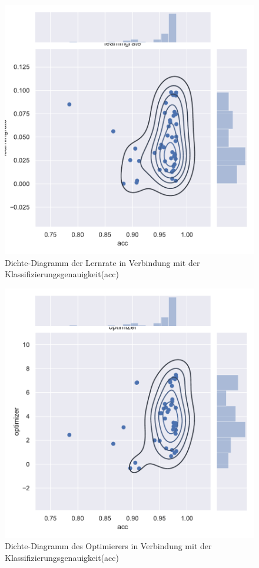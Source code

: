 \begin{figure}[H]
  \centering  
  \includegraphics[scale=0.5]{anhang/GA_250_mnist_digits_False_small_jointplot_learningrate.pdf}
  \caption{Dichte-Diagramm der Lernrate in Verbindung mit der Klassifizierungsgenauigkeit(acc)}
  
\end{figure}

\begin{figure}[H]
  \centering  
  \includegraphics[scale=0.5]{anhang/GA_250_mnist_digits_False_small_jointplot_optimizer.pdf}
  \caption{Dichte-Diagramm des Optimierers in Verbindung mit der Klassifizierungsgenauigkeit(acc)}
  
\end{figure}

